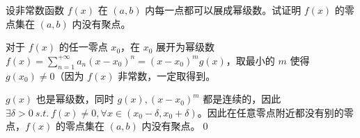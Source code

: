 \begin{ques}
	设非常数函数 $\displaystyle f( x)$ 在 $\displaystyle ( a,b)$ 内每一点都可以展成幂级数。试证明 $\displaystyle f( x)$ 的零点集在 $\displaystyle ( a,b)$ 内没有聚点。
\end{ques}



对于 $\displaystyle f( x)$ 的任一零点 $\displaystyle x_{0}$，在 $\displaystyle x_{0}$ 展开为幂级数 $\displaystyle f( x) =\sum _{n=1}^{+\infty } a_{n}( x-x_{0})^{n} =( x-x_{0})^{m} g( x)$，取最小的 $\displaystyle m$ 使得 $\displaystyle g( x_{0}) \neq 0$（因为 $\displaystyle f( x)$ 非常数，一定取得到。

$\displaystyle g( x)$ 也是幂级数，同时 $\displaystyle g( x) ,( x-x_{0})^{m}$ 都是连续的，因此 $\displaystyle \exists \delta  >0\ s.t.\ f( x) \neq 0,\forall x\in ( x_{0} -\delta ,x_{0} +\delta )$。因此在任意零点附近都没有别的零点，$\displaystyle f( x)$ 的零点集在 $\displaystyle ( a,b)$ 内没有聚点。\qed 



\ifx\allfiles\undefined

\fi